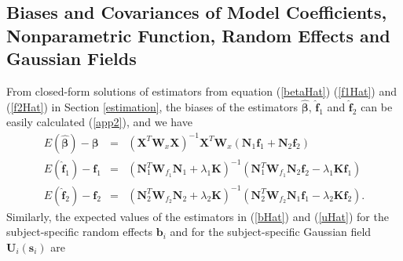 \documentclass[review]{elsarticle}
\begin{document}
\subsection{Biases and Covariances of Model Coefficients, Nonparametric Function, Random Effects and Gaussian Fields} \label{biasCov}


From closed-form solutions of estimators from equation (\ref{betaHat}) (\ref{f1Hat}) and (\ref{f2Hat}) in  Section \ref{estimation}, the biases of the estimators $\boldsymbol {\hat \beta}$, $\boldsymbol {\hat f}_1$ and 
$\boldsymbol {\hat f}_2$ can be easily calculated (\ref{app2}), and we have
\begin{eqnarray}
E(\boldsymbol {\hat \beta})  -  \boldsymbol \beta
&=& \label{biasBeta}
 (\boldsymbol X^T  \boldsymbol W_x \boldsymbol X )^{-1} \boldsymbol X^T  \boldsymbol W_x  (\boldsymbol N_1 \boldsymbol f_1
 +
  \boldsymbol N_2 \boldsymbol f_2) \\
E(\boldsymbol {\hat f}_1) - \boldsymbol f_1  
&=& \label{biasF1}
(\boldsymbol N_1^T \boldsymbol W_{f_1}  \boldsymbol N_1 
+ \lambda_1 \boldsymbol K)^{-1}  
  ( \boldsymbol N_1^T \boldsymbol W_{f_1}
  \boldsymbol N_2 \boldsymbol f_2 - \lambda_1    \boldsymbol K \boldsymbol f_1) \\
E(\boldsymbol {\hat f}_2) - \boldsymbol f_2  
&=&  \label{biasF2}
(\boldsymbol N_2^T \boldsymbol W_{f_2}  \boldsymbol N_2 
+ \lambda_2 \boldsymbol K)^{-1}  
 (\boldsymbol N_2^T \boldsymbol W_{f_2} \boldsymbol N_1 \boldsymbol f_1 
  -  \lambda_2    \boldsymbol K \boldsymbol f_2).
\end{eqnarray}
Similarly,  the expected values of the estimators in (\ref{bHat}) and (\ref{uHat}) for the subject-specific random effects $\boldsymbol b_i$ and for the subject-specific Gaussian field $\boldsymbol U_i(\boldsymbol s_i)$
 are 
\end{document}
